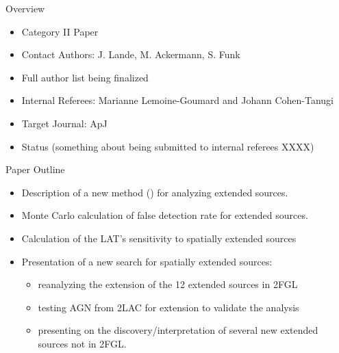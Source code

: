 \fermititle

\begin{frame}{Overview}
  \begin{itemize}
    \item Category II Paper
    \item Contact Authors: J. Lande, M. Ackermann, S. Funk
    \item Full author list being finalized
    \item Internal Referees: Marianne Lemoine-Goumard and Johann Cohen-Tanugi
    \item Target Journal: ApJ
    \item Status (something about being submitted to internal referees XXXX)
  \end{itemize}
\end{frame}

\begin{frame}{Paper Outline}
  \begin{itemize}
    \item Description of a new method (\pointlike) for analyzing extended sources.
    \item Monte Carlo calculation of false detection rate for extended sources.
    \item Calculation of the LAT's sensitivity to spatially extended sources
    \item Presentation of a new search for spatially extended sources:
      \begin{itemize}
        \item reanalyzing the extension of the 12 extended sources in 2FGL
        \item testing AGN from 2LAC for extension to validate the analysis
        \item presenting on the discovery/interpretation of several new extended sources not in 2FGL.
      \end{itemize}
  \end{itemize}
\end{frame}

